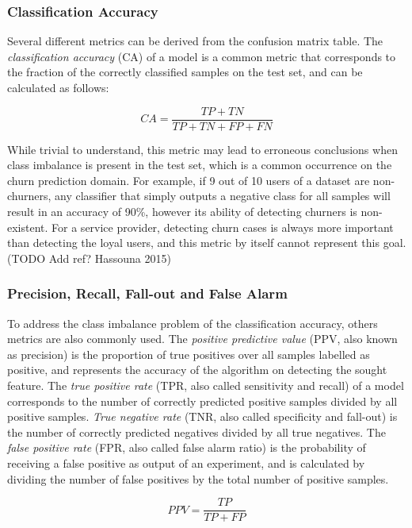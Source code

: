 \documentclass{kththesis}
\begin{document}
\subsubsection{Classification Accuracy}

Several different metrics can be derived from the confusion matrix table. The \emph{classification accuracy} (CA) of a model is a common metric that corresponds to the fraction of the correctly classified samples on the test set, and can be calculated as follows:

\begin{equation}
CA = \frac{TP + TN}{TP + TN + FP + FN} 
\end{equation}

While trivial to understand, this metric may lead to erroneous conclusions when class imbalance is present in the test set, which is a common occurrence on the churn prediction domain. For example, if 9 out of 10 users of a dataset are non-churners, any classifier that simply outputs a negative class for all samples will result in an accuracy of 90\%, however its ability of detecting churners is non-existent. For a service provider, detecting churn cases is always more important than detecting the loyal users, and this metric by itself cannot represent this goal. (TODO Add ref? Hassouna 2015)

\subsubsection{Precision, Recall, Fall-out and False Alarm}

To address the class imbalance problem of the classification accuracy, others metrics are also commonly used. The \emph{positive predictive value} (PPV, also known as precision) is the proportion of true positives over all samples labelled as positive, and represents the accuracy of the algorithm on detecting the sought feature. The \emph{true positive rate} (TPR, also called sensitivity and recall) of a model corresponds to the number of correctly predicted positive samples divided by all positive samples. \emph{True negative rate} (TNR, also called specificity and fall-out) is the number of correctly predicted negatives divided by all true negatives. The \emph{false positive rate} (FPR, also called false alarm ratio) is the probability of receiving a false positive as output of an experiment, and is calculated by dividing the number of false positives by the total number of positive samples.

\begin{equation}
PPV = \frac{TP}{TP + FP}
\end{equation}
\end{document}
